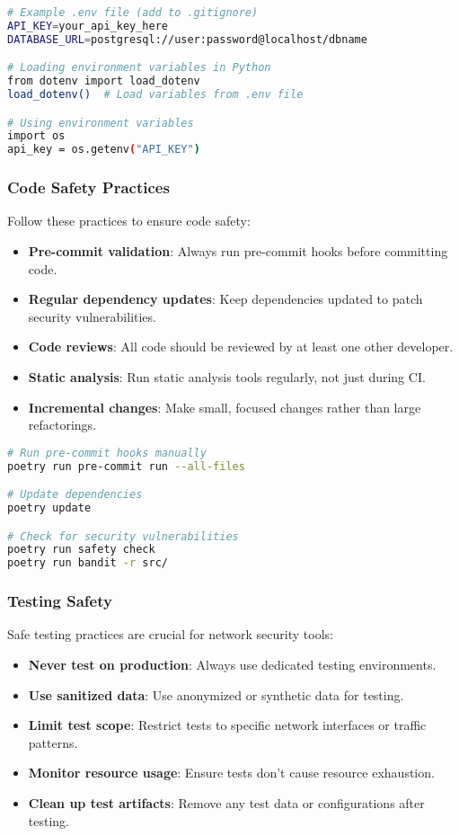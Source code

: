 \begin{lstlisting}[language=bash, caption=Secure Credential Management]
# Example .env file (add to .gitignore)
API_KEY=your_api_key_here
DATABASE_URL=postgresql://user:password@localhost/dbname

# Loading environment variables in Python
from dotenv import load_dotenv
load_dotenv()  # Load variables from .env file

# Using environment variables
import os
api_key = os.getenv("API_KEY")
\end{lstlisting}

\subsubsection{Code Safety Practices}
Follow these practices to ensure code safety:

\begin{itemize}
    \item \textbf{Pre-commit validation}: Always run pre-commit hooks before committing code.
    \item \textbf{Regular dependency updates}: Keep dependencies updated to patch security vulnerabilities.
    \item \textbf{Code reviews}: All code should be reviewed by at least one other developer.
    \item \textbf{Static analysis}: Run static analysis tools regularly, not just during CI.
    \item \textbf{Incremental changes}: Make small, focused changes rather than large refactorings.
\end{itemize}

\begin{lstlisting}[language=bash, caption=Code Safety Commands]
# Run pre-commit hooks manually
poetry run pre-commit run --all-files

# Update dependencies
poetry update

# Check for security vulnerabilities
poetry run safety check
poetry run bandit -r src/
\end{lstlisting}

\subsubsection{Testing Safety}
Safe testing practices are crucial for network security tools:

\begin{itemize}
    \item \textbf{Never test on production}: Always use dedicated testing environments.
    \item \textbf{Use sanitized data}: Use anonymized or synthetic data for testing.
    \item \textbf{Limit test scope}: Restrict tests to specific network interfaces or traffic patterns.
    \item \textbf{Monitor resource usage}: Ensure tests don't cause resource exhaustion.
    \item \textbf{Clean up test artifacts}: Remove any test data or configurations after testing.
\end{itemize}

